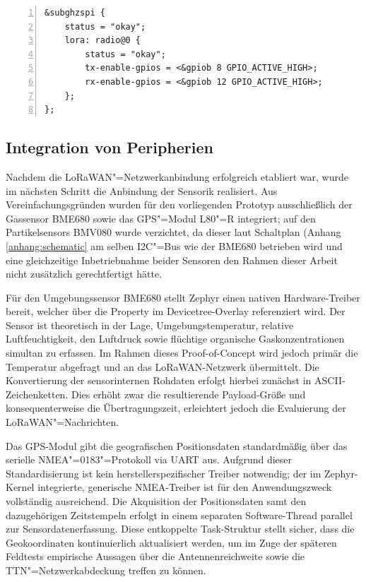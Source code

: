 \begin{lstlisting}[language=devicetree, 
    caption={Devicetree-Overlay zur Konfiguration des RF-Schalters},
    label={lst:rf_sw_overlay},
    basicstyle=\ttfamily\small,
    keywordstyle=\color{blue},
    commentstyle=\color{gray},
    stringstyle=\color{purple},
    numbers=left,
    numberstyle=\tiny\color{gray},
    stepnumber=1,
    numbersep=8pt,
    backgroundcolor=\color{gray!8},
    showstringspaces=false,
    breaklines=true,
    frame=single,
    rulecolor=\color{gray!30},
    tabsize=4
]
&subghzspi {
    status = "okay";
    lora: radio@0 {
        status = "okay";
        tx-enable-gpios = <&gpiob 8 GPIO_ACTIVE_HIGH>;
        rx-enable-gpios = <&gpiob 12 GPIO_ACTIVE_HIGH>;
    };
};
\end{lstlisting}

\subsection{Integration von Peripherien}

Nachdem die LoRaWAN"=Netzwerkanbindung erfolgreich etabliert war, wurde im nächsten Schritt die Anbindung der Sensorik realisiert. Aus Vereinfachungsgründen
wurden für den vorliegenden Prototyp ausschließlich der Gassensor BME680 sowie das GPS"=Modul L80"=R integriert; auf den Partikelsensors
BMV080 wurde verzichtet, da dieser laut Schaltplan (Anhang \ref{anhang:schematic} am selben I2C"=Bus wie der BME680 
betrieben wird und eine gleichzeitige Inbetriebnahme beider Sensoren den Rahmen dieser Arbeit nicht zusätzlich gerechtfertigt hätte.

Für den Umgebungssensor BME680 stellt Zephyr einen nativen Hardware-Treiber bereit, welcher über die Property 
 im Devicetree-Overlay referenziert wird. Der Sensor ist theoretisch in der Lage, 
Umgebungstemperatur, relative Luftfeuchtigkeit, den Luftdruck sowie flüchtige organische Gaskonzentrationen 
simultan zu erfassen. Im Rahmen dieses \mbox{Proof-of-Concept} wird jedoch primär die Temperatur abgefragt und an das 
LoRaWAN-Netzwerk übermittelt. Die Konvertierung der sensorinternen Rohdaten erfolgt hierbei zunächst in ASCII-Zeichenketten. 
Dies erhöht zwar die resultierende Payload-Größe und konsequenterweise die Übertragungszeit, erleichtert jedoch 
die Evaluierung der LoRaWAN"=Nachrichten.

Das GPS-Modul gibt die geografischen Positionsdaten standardmäßig über das serielle NMEA"=0183"=Protokoll 
via UART aus. Aufgrund dieser Standardisierung ist kein herstellerspezifischer Treiber notwendig; 
der im Zephyr-Kernel integrierte, generische NMEA-Treiber ist für den Anwendungszweck vollständig ausreichend. 
Die Akquisition der Positionsdaten samt den dazugehörigen Zeitstempeln erfolgt in einem separaten Software-Thread parallel 
zur Sensordatenerfassung. Diese entkoppelte Task-Struktur stellt sicher, dass die Geokoordinaten kontinuierlich 
aktualisiert werden, um im Zuge der späteren Feldtests empirische Aussagen über die Antennenreichweite 
sowie die TTN"=Netzwerkabdeckung treffen zu können.

